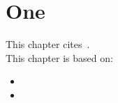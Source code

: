 \chapter{One}
This chapter cites~\cite{steiner_nwesp_2011,vanhooland_ukmw_2011}.
\\[\baselineskip]

\noindent
This chapter is based on:
\begin{itemize}
  \item {}
  \item {}
\end{itemize}

\printbibliography[heading=subbibliography,notcategory=onlyfullcite]
